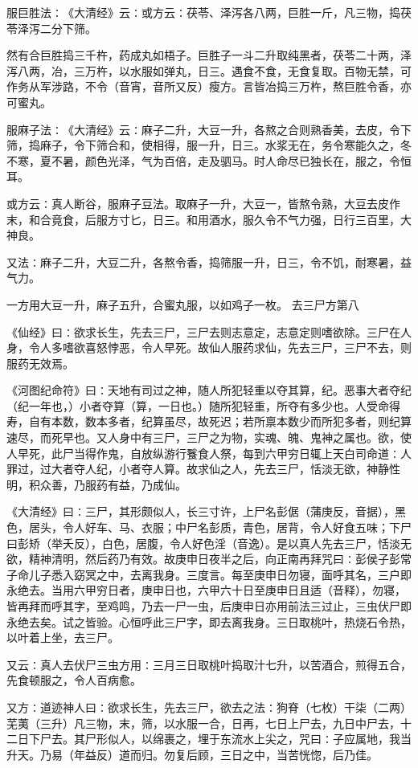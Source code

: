 \documentclass[a4paper,12pt,UTF8,twoside]{ctexbook}
\begin{document}
服巨胜法∶《大清经》云∶或方云∶茯苓、泽泻各八两，巨胜一斤，凡三物，捣茯苓泽泻二分下筛。

然有合巨胜捣三千杵，药成丸如梧子。巨胜子一斗二升取纯黑者，茯苓二十两，泽泻八两，冶，三万杵，以水服如弹丸，日三。遇食不食，无食复取。百物无禁，可作务从军涉路，不令（音宵，音所又反）瘦方。言皆冶捣三万杵，熬巨胜令香，亦可蜜丸。

服麻子法∶《大清经》云∶麻子二升，大豆一升，各熬之合则熟香美，去皮，令下筛，捣麻子，令下筛合和，使相得，服一升，日三。水浆无在，务令寒能久之，冬不寒，夏不暑，颜色光泽，气为百倍，走及驷马。时人命尽已独长在，服之，令恒耳。

或方云∶真人断谷，服麻子豆法。取麻子一升，大豆一，皆熬令熟，大豆去皮作末，和合竟食，后服方寸匕，日三。和用酒水，服久令不气力强，日行三百里，大神良。

又法∶麻子二升，大豆二升，各熬令香，捣筛服一升，日三，令不饥，耐寒暑，益气力。

一方用大豆一升，麻子五升，合蜜丸服，以如鸡子一枚。
去三尸方第八

《仙经》曰∶欲求长生，先去三尸，三尸去则志意定，志意定则嗜欲除。三尸在人身，令人多嗜欲喜怒悖恶，令人早死。故仙人服药求仙，先去三尸，三尸不去，则服药无效焉。

《河图纪命符》曰∶天地有司过之神，随人所犯轻重以夺其算，纪。恶事大者夺纪（纪一年也，）小者夺算（算，一日也。）随所犯轻重，所夺有多少也。人受命得寿，自有本数，数本多者，纪算虽尽，故死迟；若所禀本数少而所犯多者，则纪算速尽，而死早也。又人身中有三尸，三尸之为物，实魂、魄、鬼神之属也。欲，使人早死，此尸当得作鬼，自放纵游行餮食人祭，每到六甲穷日辄上天白司命道∶人罪过，过大者夺人纪，小者夺人算。故求仙之人，先去三尸，恬淡无欲，神静性明，积众善，乃服药有益，乃成仙。

《大清经》曰∶三尸，其形颇似人，长三寸许，上尸名彭倨（蒲庚反，音据），黑色，居头，令人好车、马、衣服；中尸名彭质，青色，居背，令人好食五味；下尸曰彭矫（举夭反），白色，居腹，令人好色淫（音逸）。是以真人先去三尸，恬淡无欲，精神清明，然后药乃有效。故庚申日夜半之后，向正南再拜咒曰∶彭侯子彭常子命儿子悉入窈冥之中，去离我身。三度言。每至庚申日勿寝，面呼其名，三户即永绝去。当用六甲穷日者，庚申日也，六甲六十日至庚申日且适（音释），勿寝，皆再拜而呼其字，至鸡鸣，乃去一尸一虫，后庚申日亦用前法三过止，三虫伏尸即永绝去矣。试之皆验。心恒呼此三尸字，即去离我身。三日取桃叶，热烧石令热，以叶着上坐，去三尸。

又云∶真人去伏尸三虫方用∶三月三日取桃叶捣取汁七升，以苦酒合，煎得五合，先食顿服之，令人百病愈。

又方∶道迹神人曰∶欲求长生，先去三尸，欲去之法∶狗脊（七枚）干柒（二两）芜荑（三升）凡三物，末，筛，以水服一合，日再，七日上尸去，九日中尸去，十二日下尸去。其尸形似人，以绵裹之，埋于东流水上尖之，咒曰∶子应属地，我当升天。乃易（年益反）道而归。勿复后顾，三日之中，当苦恍惚，后乃佳。
\end{document}
